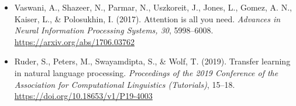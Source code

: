﻿\documentclass{article}
\begin{document}
\begin{itemize}
    \item Vaswani, A., Shazeer, N., Parmar, N., Uszkoreit, J., Jones, L., Gomez, A. N., Kaiser, L., \& Polosukhin, I. (2017). Attention is all you need. \textit{Advances in Neural Information Processing Systems, 30}, 5998–6008. \url{https://arxiv.org/abs/1706.03762}

    \item Ruder, S., Peters, M., Swayamdipta, S., \& Wolf, T. (2019). Transfer learning in natural language processing. \textit{Proceedings of the 2019 Conference of the Association for Computational Linguistics (Tutorials)}, 15–18. \url{https://doi.org/10.18653/v1/P19-4003}
\end{itemize}
\end{document}
